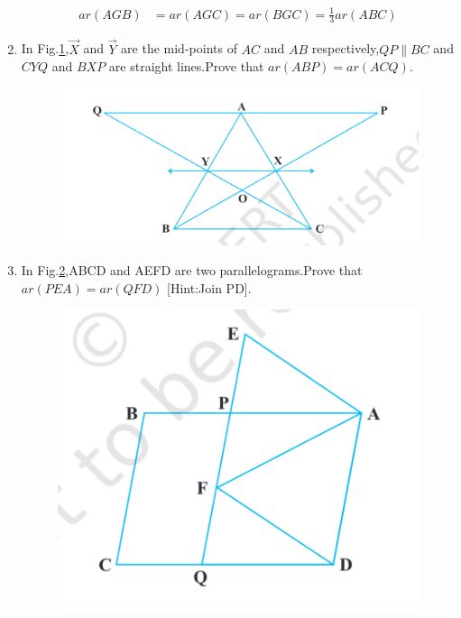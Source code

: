 \begin{enumerate}[label=\thesection.\arabic*,ref=\thesection.\theenumi]
	\begin{align} 
		{ar (AGB)} &={ar (AGC)}= {ar (BGC)} = \frac{1}{3} {ar (ABC)}
	\end{align}
\item In Fig.\ref{fig:exemplar/9.9.4/9.26},$\vec{X}$ and $\vec{Y}$ are the mid-points of $AC$ and $AB$ respectively,$QP \parallel BC$ and $CYQ$ and $BXP$ are straight lines.Prove that $ ar (ABP) = ar (ACQ) $.
\begin{figure}[h]
	\centering
	\includegraphics[width=\columnwidth]{exemplar/9.9.4/figs/Fig9.26.png}
	\caption{}
	\label{fig:exemplar/9.9.4/9.26}
\end{figure}
\item In Fig.\ref{fig:exemplar/9.9.4/9.27},ABCD and AEFD are two parallelograms.Prove that $ ar (PEA) = ar (QFD) $ [Hint:Join PD].
\begin{figure}[h]
	\centering
	\includegraphics[width=\columnwidth]{exemplar/9.9.4/figs/Fig9.27.png}
	\caption{}
	\label{fig:exemplar/9.9.4/9.27}
\end{figure}
\end{enumerate}
